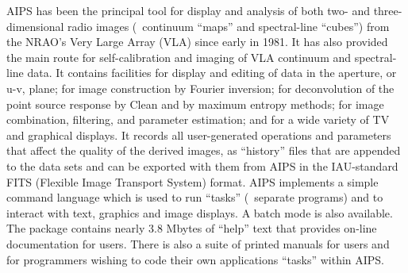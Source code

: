     AIPS has been the principal tool for display and analysis of both
two- and three-dimensional radio images (\ie\ continuum ``maps'' and
spectral-line ``cubes'') from the NRAO's Very Large Array (VLA) since
early in 1981.  It has also provided the main route for
self-calibration and imaging of VLA continuum and spectral-line data.
It contains facilities for display and editing of data in the
aperture, or u-v, plane; for image construction by Fourier inversion;
for deconvolution of the point source response by Clean and by maximum
entropy methods; for image combination, filtering, and parameter
estimation; and for a wide variety of TV and graphical displays.  It
records all user-generated operations and parameters that affect the
quality of the derived images, as ``history'' files that are appended
to the data sets and can be exported with them from AIPS in the
IAU-standard FITS (Flexible Image Transport System) format.  AIPS
implements a simple command language which is used to run ``tasks''
(\ie\ separate programs) and to interact with text, graphics and image
displays.  A batch mode is also available.  The package contains nearly
3.8 Mbytes of ``help'' text that provides on-line documentation for
users.  There is also a suite of printed manuals for users and for
programmers wishing to code their own applications ``tasks'' within
AIPS.

